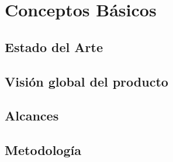 


\chapter{Conceptos Básicos}
\thispagestyle{fancy}

\section{Estado del Arte}
\lorem{} %

\section{Visión global del producto}
\lorem{} %

\section{Alcances}
\lorem{} %

\section{Metodología}
\lorem{} %


